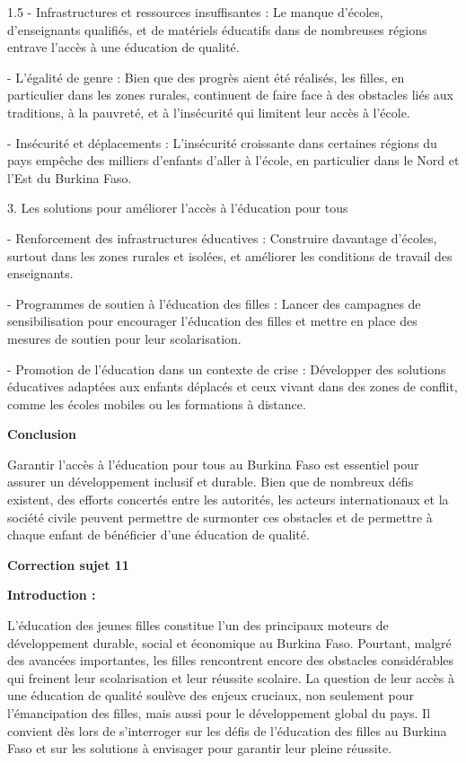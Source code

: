 \documentclass[12pt]{article}
\begin{document}
\begin{spacing}{1.5}
   - Infrastructures et ressources insuffisantes : Le manque d'écoles, d'enseignants qualifiés, et de matériels éducatifs dans de nombreuses régions entrave l'accès à une éducation de qualité. 
    
   - L'égalité de genre : Bien que des progrès aient été réalisés, les filles, en particulier dans les zones rurales, continuent de faire face à des obstacles liés aux traditions, à la pauvreté, et à l'insécurité qui limitent leur accès à l'école.
     
   - Insécurité et déplacements : L'insécurité croissante dans certaines régions du pays empêche des milliers d'enfants d'aller à l'école, en particulier dans le Nord et l'Est du Burkina Faso.  
   
3. Les solutions pour améliorer l'accès à l'éducation pour tous
 
   - Renforcement des infrastructures éducatives : Construire davantage d'écoles, surtout dans les zones rurales et isolées, et améliorer les conditions de travail des enseignants.
    
   - Programmes de soutien à l'éducation des filles : Lancer des campagnes de sensibilisation pour encourager l'éducation des filles et mettre en place des mesures de soutien pour leur scolarisation.  
   
   - Promotion de l'éducation dans un contexte de crise : Développer des solutions éducatives adaptées aux enfants déplacés et ceux vivant dans des zones de conflit, comme les écoles mobiles ou les formations à distance.

\textbf{Conclusion }

Garantir l'accès à l'éducation pour tous au Burkina Faso est essentiel pour assurer un développement inclusif et durable. Bien que de nombreux défis existent, des efforts concertés entre les autorités, les acteurs internationaux et la société civile peuvent permettre de surmonter ces obstacles et de permettre à chaque enfant de bénéficier d'une éducation de qualité.



\textbf{Correction sujet 11}

\textbf{Introduction :}
 
L'éducation des jeunes filles constitue l'un des principaux moteurs de développement durable, social et économique au Burkina Faso. Pourtant, malgré des avancées importantes, les filles rencontrent encore des obstacles considérables qui freinent leur scolarisation et leur réussite scolaire. La question de leur accès à une éducation de qualité soulève des enjeux cruciaux, non seulement pour l'émancipation des filles, mais aussi pour le développement global du pays. Il convient dès lors de s'interroger sur les défis de l'éducation des filles au Burkina Faso et sur les solutions à envisager pour garantir leur pleine réussite.


\end{spacing}
\end{document}
